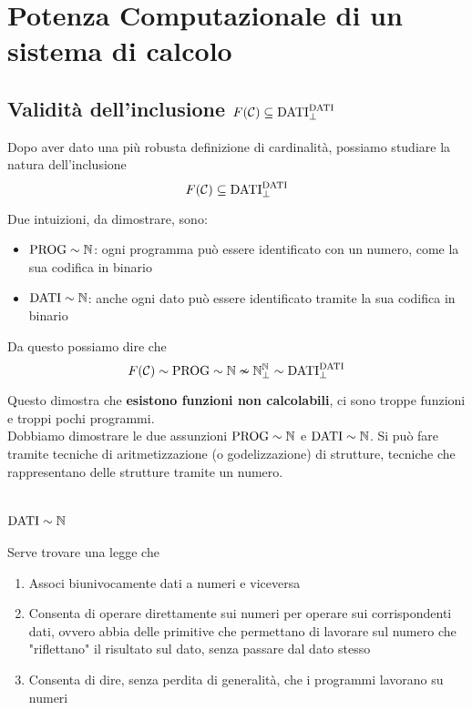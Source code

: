 \section{Potenza Computazionale di un sistema di calcolo}
\subsection{Validità dell'inclusione $F(\mathcal{C}) \subseteq \text{DATI}_\bot^{\text{DATI}}$}

Dopo aver dato una più robusta definizione di cardinalità, possiamo studiare la natura dell'inclusione
$$ F(\mathcal{C}) \subseteq \text{DATI}_\bot^{\text{DATI}} $$

Due intuizioni, da dimostrare, sono: 
\begin{itemize}
	\item $\text{PROG} \sim \mathbb{N}$: ogni programma può essere identificato con un numero, come la sua codifica in binario
	\item $\text{DATI} \sim \mathbb{N}$: anche ogni dato può essere identificato tramite la sua codifica in binario
\end{itemize}

Da questo possiamo dire che
$$ F(\mathcal{C}) \sim \text{PROG} \sim \mathbb{N} \nsim \mathbb{N}_\bot^{\mathbb{N}} \sim \text{DATI}_\bot^{\text{DATI}} $$

Questo dimostra che \textbf{esistono funzioni non calcolabili}, ci sono troppe funzioni e troppi pochi programmi.\\

Dobbiamo dimostrare le due assunzioni $\text{PROG} \sim \mathbb{N}$ e $\text{DATI} \sim \mathbb{N}$. Si può fare tramite tecniche di aritmetizzazione (o godelizzazione) di strutture, tecniche che rappresentano delle strutture tramite un numero.

\section{$\text{DATI} \sim \mathbb{N}$}
Serve trovare una legge che
\begin{enumerate}
	\item Associ biunivocamente dati a numeri e viceversa
	\item Consenta di operare direttamente sui numeri per operare sui corrispondenti dati, ovvero abbia delle primitive che permettano di lavorare sul numero che "riflettano" il risultato sul dato, senza passare dal dato stesso
	\item Consenta di dire, senza perdita di generalità, che i programmi lavorano su numeri
\end{enumerate}

